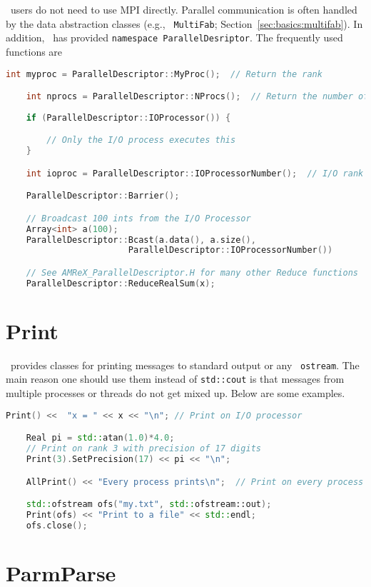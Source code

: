 \amrex\ users do not need to use MPI directly.  Parallel communication
is often handled by the data abstraction classes (e.g., {\tt
  MultiFab}; Section~\ref{sec:basics:multifab}).  In addition, \amrex\
has provided {\tt namespace ParallelDesriptor}.  The frequently used
functions are 
\begin{lstlisting}[language=cpp]
    int myproc = ParallelDescriptor::MyProc();  // Return the rank

    int nprocs = ParallelDescriptor::NProcs();  // Return the number of processes
 
    if (ParallelDescriptor::IOProcessor()) {

        // Only the I/O process executes this
    }

    int ioproc = ParallelDescriptor::IOProcessorNumber();  // I/O rank

    ParallelDescriptor::Barrier();

    // Broadcast 100 ints from the I/O Processor
    Array<int> a(100);
    ParallelDescriptor::Bcast(a.data(), a.size(),
                        ParallelDescriptor::IOProcessorNumber())

    // See AMReX_ParallelDescriptor.H for many other Reduce functions 
    ParallelDescriptor::ReduceRealSum(x);
\end{lstlisting}

\section{Print}
\label{sec:basics:print}

\amrex\ provides classes for printing messages to standard output or
any \cpp\ {\tt ostream}.  The main reason one should use them instead
of {\tt std::cout} is that messages from multiple processes or
threads do not get mixed up.  Below are some examples.
\begin{lstlisting}[language=cpp]
    Print() <<  "x = " << x << "\n"; // Print on I/O processor

    Real pi = std::atan(1.0)*4.0;
    // Print on rank 3 with precision of 17 digits
    Print(3).SetPrecision(17) << pi << "\n";

    AllPrint() << "Every process prints\n";  // Print on every process

    std::ofstream ofs("my.txt", std::ofstream::out);
    Print(ofs) << "Print to a file" << std::endl;
    ofs.close();
\end{lstlisting}

\section{ParmParse}

